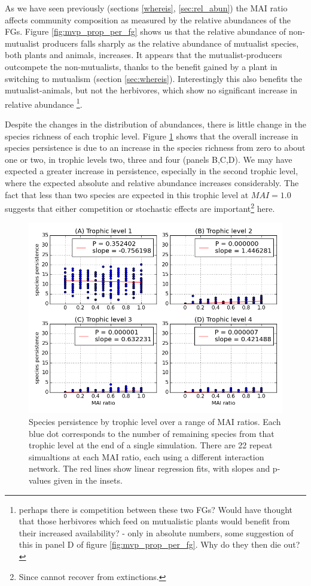 As we have seen previously (sections \ref{whereis}, \ref{sec:rel_abun}) the MAI ratio affects community composition as measured by the relative abundances of the FGs. Figure \ref{fig:mvp_prop_per_fg} shows us that the relative abundance of non-mutualist producers falls sharply as the relative abundance of mutualist species, both plants and animals, increases. It appears that the mutualist-producers outcompete the non-mutualists, thanks to the benefit gained by a plant in switching to mutualism (section \ref{sec:whereis}). Interestingly this also benefits the mutualist-animals, but not the herbivores, which show no significant increase in relative abundance \footnote{perhaps there is competition between these two FGs? Would have thought that those herbivores which feed on mutualistic plants would benefit from their increased availability? - only in absolute numbers, some suggestion of this in panel D of figure \ref{fig:mvp_prop_per_fg}. Why do they then die out?}. 

Despite the changes in the distribution of abundances, there is little change in the species richness of each trophic level. Figure \ref{fig:mvp_species_per_tl} shows that the overall increase in species persistence is due to an increase in the species richness from zero to about one or two, in trophic levels two, three and four (panels B,C,D). We may have expected a greater increase in persistence, especially in the second trophic level, where the expected absolute and relative abundance increases considerably. The fact that less than two species are expected in this trophic level at $MAI = 1.0$ suggests that either competition or stochastic effects are important\footnote{Since cannot recover from extinctions.} here.    


\begin{figure}
	\centering
	\includegraphics[width=0.8\linewidth]{"figures/persistence/species_richness_per_trophic_level"}
	\caption{Species persistence by trophic level over a range of MAI ratios. Each blue dot corresponds to the number of remaining species from that trophic level at the end of a single simulation. There are 22 repeat simualtions at each MAI ratio, each using a different interaction network. The red lines show linear regression fits, with slopes and p-values given in the insets.}
	\label{fig:mvp_species_per_tl}
\end{figure}

